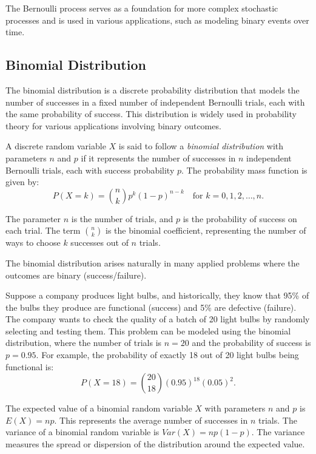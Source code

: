 The Bernoulli process serves as a foundation for more complex stochastic processes and is used in various applications, such as modeling binary events over time.

%
%

\subsection{Binomial Distribution}

The binomial distribution is a discrete probability distribution that models the number of successes in a fixed number of independent Bernoulli trials, each with the same probability of success. This distribution is widely used in probability theory for various applications involving binary outcomes.

\begin{definition}
\label{def:binomial_distribution}
A discrete random variable $X$ is said to follow a \emph{binomial distribution} with parameters $n$ and $p$ if it represents the number of successes in $n$ independent Bernoulli trials, each with success probability $p$. The probability mass function is given by:
\[
P(X = k) = \binom{n}{k} p^k (1 - p)^{n - k} \quad \text{for } k = 0, 1, 2, \ldots, n.
\]
\end{definition}

The parameter $n$ is the number of trials, and $p$ is the probability of success on each trial. The term $\binom{n}{k}$ is the binomial coefficient, representing the number of ways to choose $k$ successes out of $n$ trials.

The binomial distribution arises naturally in many applied problems where the outcomes are binary (success/failure).

\begin{example}
Suppose a company produces light bulbs, and historically, they know that 95\% of the bulbs they produce are functional (success) and 5\% are defective (failure). The company wants to check the quality of a batch of 20 light bulbs by randomly selecting and testing them. This problem can be modeled using the binomial distribution, where the number of trials is $n = 20$ and the probability of success is $p = 0.95$. For example, the probability of exactly 18 out of 20 light bulbs being functional is:
\[
P(X = 18) = \binom{20}{18} (0.95)^{18} (0.05)^2.
\]
\end{example}

The expected value of a binomial random variable $X$ with parameters $n$ and $p$ is $E(X) = np$. This represents the average number of successes in $n$ trials. The variance of a binomial random variable is $Var(X) = np(1 - p)$. The variance measures the spread or dispersion of the distribution around the expected value.

